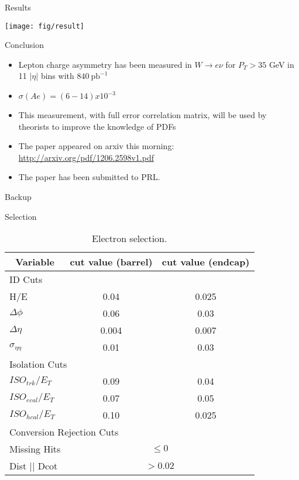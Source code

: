 \documentclass[t, 8pt]{beamer}
\begin{document}
\begin{frame}{Results}
  \begin{center}
    \texttt{[image: fig/result]}
  \end{center}
\end{frame}

\begin{frame}{Conclusion}
  \begin{itemize}
    \item Lepton charge asymmetry has been measured in $W\to e\nu$ for $P_T>35$
    GeV in 11 $|\eta|$ bins with $840\ \mathrm{pb}^{-1}$ 
    \item $\sigma(Ae) = (6-14) x 10^{-3}$
    \item This measurement, with full error correlation matrix, will be used by theorists to
    improve the knowledge of PDFs
    \vspace{1cm}
    \item The paper appeared on arxiv this morning:
    \url{http://arxiv.org/pdf/1206.2598v1.pdf}
    \item The paper has been submitted to PRL.

  \end{itemize}
\end{frame}


\begin{frame}{Backup}
\end{frame}

\begin{frame}{Selection}
\tiny{
\begin{center}
    \begin{table}[htbp]
    \begin{tabular}{|lcc|} \hline
      \multicolumn{1}{|c}{Variable} & \multicolumn{1}{c}{cut value (barrel)}& \multicolumn{1}{c|}{cut value (endcap)}\\
        \hline   \hline
       \multicolumn{3}{|l|}{ID Cuts}\\ \hline
        H/E & 0.04 & 0.025 \\
        $\Delta\phi$ & 0.06 & 0.03 \\
        $\Delta\eta$ & 0.004 & 0.007  \\
        $\sigma_{\eta\eta}$ & 0.01 & 0.03 \\ \hline
      \multicolumn{3}{|l|}{Isolation Cuts}\\ \hline
       $ISO_{trk} / E_T $  & 0.09 & 0.04 \\
       $ISO_{ecal}/ E_T$  & 0.07 & 0.05 \\
       $ISO_{hcal}/ E_T$  & 0.10 & 0.025 \\ \hline
      \multicolumn{3}{|l|}{Conversion Rejection Cuts}\\ \hline
       Missing Hits  & \multicolumn{2}{c|}{$\leq 0$}\\
       Dist $||$ Dcot   & \multicolumn{2}{c|}{$>0.02$}\\
      \hline
    \end{tabular}
    \caption{\label{tab:elecuts} Electron selection.}%
    \end{table}
\end{center}
    }
\end{frame}
\end{document}
